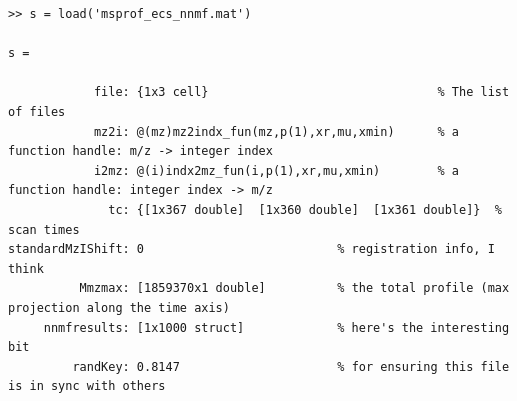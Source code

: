 \documentclass[notitlepage]{revtex4-1}
\begin{document}
\begin{verbatim}
>> s = load('msprof_ecs_nnmf.mat')

s = 

            file: {1x3 cell}                                % The list of files
            mz2i: @(mz)mz2indx_fun(mz,p(1),xr,mu,xmin)      % a function handle: m/z -> integer index
            i2mz: @(i)indx2mz_fun(i,p(1),xr,mu,xmin)        % a function handle: integer index -> m/z
              tc: {[1x367 double]  [1x360 double]  [1x361 double]}  % scan times
standardMzIShift: 0                           % registration info, I think
          Mmzmax: [1859370x1 double]          % the total profile (max projection along the time axis)
     nnmfresults: [1x1000 struct]             % here's the interesting bit
         randKey: 0.8147                      % for ensuring this file is in sync with others

\end{verbatim}
\end{document}
